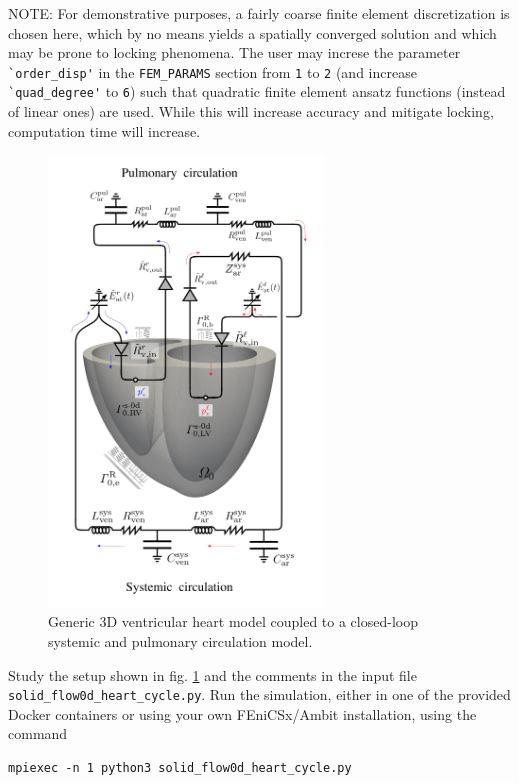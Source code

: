 \documentclass[a4paper,12pt]{report}
\begin{document}
NOTE: For demonstrative purposes, a fairly coarse finite element discretization is chosen here, which by no means yields a spatially converged solution and which
may be prone to locking phenomena. The user may increse the parameter \verb"`order_disp'" in the \verb"FEM_PARAMS" section from \verb"1" to \verb"2" (and increase \verb"`quad_degree'" to \verb"6") such that quadratic finite element ansatz functions (instead of linear ones) are used. While this will increase accuracy and mitigate locking, computation time will
increase.

\begin{figure}
\centering
\includegraphics[width=0.65\textwidth]{fig/heart_syspul_setup.png}
\caption{Generic 3D ventricular heart model coupled to a closed-loop systemic and pulmonary circulation model.}
\label{fig:heart_syspul_setup}
\end{figure}

Study the setup shown in fig. \ref{fig:heart_syspul_setup} and the comments in the input file \verb"solid_flow0d_heart_cycle.py". Run the simulation, either in one of the provided Docker containers or using your own FEniCSx/Ambit installation, using the command
\begin{verbatim}
mpiexec -n 1 python3 solid_flow0d_heart_cycle.py
\end{verbatim}
\end{document}
